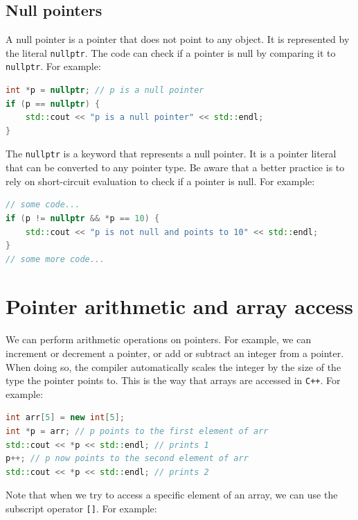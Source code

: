 \subsection{Null pointers}

A null pointer is a pointer that does not point to any object. It is represented by the literal \texttt{nullptr}.
The code can check if a pointer is null by comparing it to \texttt{nullptr}. For example:\\

\begin{lstlisting}[language=C++]
int *p = nullptr; // p is a null pointer
if (p == nullptr) {
    std::cout << "p is a null pointer" << std::endl;
}
\end{lstlisting}

The \texttt{nullptr} is a keyword that represents a null pointer. It is a pointer literal that can be converted to any pointer type.
Be aware that a better practice is to rely on short-circuit evaluation to check if a pointer is null. For example:\\

\begin{lstlisting}[language=C++]
// some code...
if (p != nullptr && *p == 10) {
    std::cout << "p is not null and points to 10" << std::endl;
}
// some more code...
\end{lstlisting}

\section{Pointer arithmetic and array access}

We can perform arithmetic operations on pointers. For example, we can increment or decrement a pointer, or add or subtract an integer
from a pointer. When doing so, the compiler automatically scales the integer by the size of the type the pointer points to. This is the 
way that arrays are accessed in \texttt{C++}. For example:\\

\begin{lstlisting}[language=C++]
int arr[5] = new int[5];
int *p = arr; // p points to the first element of arr
std::cout << *p << std::endl; // prints 1
p++; // p now points to the second element of arr
std::cout << *p << std::endl; // prints 2
\end{lstlisting}

Note that when we try to access a specific element of an array, we can use the subscript operator \texttt{[]}. For example:\\

